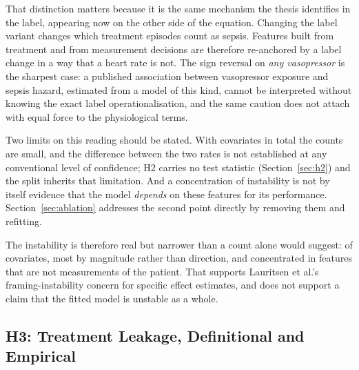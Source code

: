 That distinction matters because it is the same mechanism the thesis identifies
in the label, appearing now on the other side of the equation. Changing the
label variant changes which treatment episodes count as sepsis. Features built
from treatment and from measurement decisions are therefore re-anchored by a
label change in a way that a heart rate is not. The sign reversal on \emph{any
vasopressor} is the sharpest case: a published association between vasopressor
exposure and sepsis hazard, estimated from a model of this kind, cannot be
interpreted without knowing the exact label operationalisation, and the
same caution does not attach with equal force to the physiological terms.

Two limits on this reading should be stated. With \pcHTwoNTerms{} covariates in
total the counts are small, and the difference between the two rates is not
established at any conventional level of confidence; H2 carries no test
statistic (Section~\ref{sec:h2}) and the split inherits that limitation. And a
concentration of instability is not by itself evidence that the model
\emph{depends} on these features for its performance. Section~\ref{sec:ablation}
addresses the second point directly by removing them and refitting.

The instability is therefore real but narrower than a count alone would suggest:
\pcHTwoEst{} of \pcHTwoNTerms{} covariates, most by magnitude rather than
direction, and concentrated in features that are not measurements of the
patient. That supports Lauritsen et al.'s \cite{lauritsen2021framing}
framing-instability concern for specific effect estimates, and does not support
a claim that the fitted model is unstable as a whole.

\subsection{H3: Treatment Leakage, Definitional and Empirical}
\label{sec:h3}


